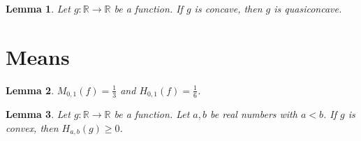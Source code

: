 \documentclass{article}
\newtheorem{lemma}{Lemma}
\begin{document}
\begin{lemma}\label{quasiconcave}
Let $g:\mathbb{R}\to\mathbb{R}$ be a function. If $g$ is concave, then $g$ is quasiconcave.
\end{lemma}

\section{Means}

\begin{lemma}\label{mean}
$M_{0,1}(f)=\frac13$ and $H_{0,1}(f)=\frac16$.
\end{lemma}

\begin{lemma}\label{hermite}
Let $g:\mathbb{R}\to\mathbb{R}$ be a function. Let $a,b$ be real numbers with $a<b$. If $g$ is convex, then $H_{a,b}(g)\ge0$.
\end{lemma}
\end{document}
